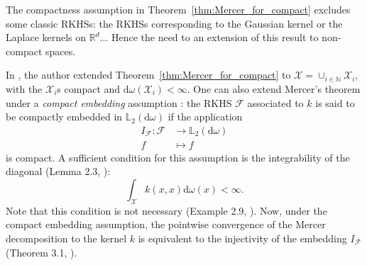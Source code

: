 \documentclass[twoside,11pt]{book}
\newtheorem{theorem}{Theorem}
\numberwithin{theorem}{chapter}
\numberwithin{definition}{chapter}
\numberwithin{proposition}{chapter}
\numberwithin{corollary}{chapter}
\numberwithin{example}{chapter}
\numberwithin{lemma}{chapter}
\begin{document}
The compactness assumption in Theorem~\ref{thm:Mercer_for_compact} excludes some classic RKHSs: the RKHSs corresponding to the Gaussian kernel or the Laplace kernels on $\mathbb{R}^{d}$...
Hence the need to an extension of this result to non-compact spaces.

In \cite{Sun05}, the author extended Theorem~\ref{thm:Mercer_for_compact} to $\mathcal{X} = \cup_{i \in \mathbb{N}} \mathcal{X}_{i}$, with the $\mathcal{X}_{i}$s compact and $\mathrm{d}\omega(\mathcal{X}_{i})<\infty$. One can also extend Mercer's theorem under a \textit{compact embedding} assumption \citep{StSc12}: the RKHS $\mathcal{F}$ associated to $k$ is said to be compactly embedded in $\mathbb{L}_{2}(\mathrm{d}\omega)$ if the application
\begin{align*}
  I_{\mathcal{F}}: \mathcal{F}&\longrightarrow \mathbb{L}_{2}(\mathrm{d}\omega) \\
  f &\longmapsto f
\end{align*}
is compact.
A sufficient condition for this assumption is the integrability of the diagonal (Lemma 2.3, \citep{StSc12}):
\begin{equation}
\int_{\mathcal{X}} k(x,x) \mathrm{d}\omega(x) < \infty.
\end{equation}
Note that this condition is not necessary (Example 2.9, \citep{StSc12}). Now, under the compact embedding assumption, the pointwise convergence of the Mercer decomposition to the kernel $k$ is equivalent to the injectivity of the embedding $I_{\mathcal{F}}$ (Theorem 3.1, \citep{StSc12}).
\end{document}
